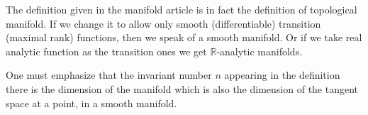 \documentclass[12pt]{article}
\begin{document}
The definition given in the manifold article is in fact the definition of topological manifold. If we change it to allow only smooth (differentiable) transition (maximal rank) functions, then we speak of a smooth manifold.  
Or if we take real analytic function as the transition ones we get $\mathbb{R}$-analytic manifolds.

One must emphasize that the invariant number $n$ appearing in the definition there is the dimension of the manifold which is also the dimension of the tangent space at a point, in a smooth manifold.
\end{document}
